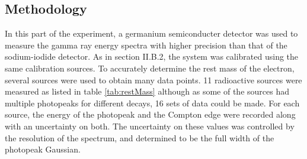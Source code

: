 \documentclass[%
reprint,
amsmath,amssymb,
aps,
floatfix
]{revtex4-2}
\begin{document}
		\subsection{Methodology}
			In this part of the experiment, a germanium semiconducter detector was used to measure the gamma ray energy spectra with higher precision than that of the sodium-iodide detector. As in section II.B.2, the system was calibrated using the same calibration sources. To accurately determine the rest mass of the electron, several sources were used to obtain many data points. 11 radioactive sources were measured as listed in table \ref{tab:restMass} although as some of the sources had multiple photopeaks for different decays, 16 sets of data could be made. For each source, the energy of the photopeak and the Compton edge were recorded along with an uncertainty on both. The uncertainty on these values was controlled by the resolution of the spectrum, and determined to be the full width of the photopeak Gaussian.
			
\end{document}
